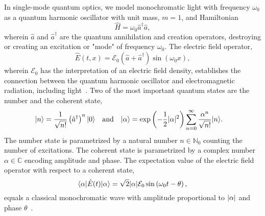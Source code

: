In single-mode quantum optics, we model monochromatic light with frequency $\omega_0$ as a quantum harmonic oscillator with unit mass, $m=1$, and Hamiltonian~\cite{Gerry2005,Fox2006}
\begin{equation}
	\hat{H}
	=
	\omega_0
	\hat{a}^\dagger
	\hat{a}
	,
\end{equation}
wherein $\hat{a}$ and $\hat{a}^\dagger$ are the quantum annihilation and creation operators, destroying or creating an excitation or "mode" of frequency $\omega_0$.
The electric field operator,
\begin{equation}
	\hat{E}(t,x)
	=
	\mathcal{E}_0
	\left(
		\hat{a}
		+
		\hat{a}^\dagger
	\right)
	\sin(\omega_0x)
	,
\end{equation}
wherein $\mathcal{E}_0$ has the interpretation of an electric field density, establishes the connection between the quantum harmonic oscillator and electromagnetic radiation, including light~\cite[p.~12]{Gerry2005}.
Two of the most important quantum states are the number and the coherent state,
\begin{align}
	\lvert n\rangle
	&=
	\frac{1}{\sqrt{n!}}
	\left(\hat{a}^\dagger\right)^n
	\lvert0\rangle
	&
	&\text{and}
	&
	\lvert\alpha\rangle
	&=
	\exp\left(-\frac{1}{2}\lvert\alpha\rvert^2\right)
	\sum_{n=0}^\infty
	\frac{\alpha^n}{\sqrt{n!}}
	\lvert n\rangle
	.
\end{align}
The number state is parametrized by a natural number $n\in\mathbb{N}_0$ counting the number of excitations.
The coherent state is parametrized by a complex number $\alpha\in\mathbb{C}$ encoding amplitude and phase.
The expectation value of the electric field operator with respect to a coherent state,
\begin{equation}
	\langle\alpha\rvert
	\hat{E}(t)
	\lvert\alpha\rangle
	=
	\sqrt{2}
	\lvert\alpha\rvert
	\mathcal{E}_0
	\sin\left(\omega_0t-\theta\right)
	,
\end{equation}
equals a classical monochromatic wave with amplitude proportional to $\lvert\alpha\rvert$ and phase $\theta$~\cite[p.~45]{Gerry2005}.

